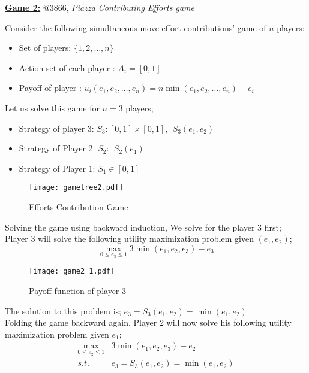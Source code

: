 \documentclass[10pt,leqno]{report}
\begin{document}
\textbf{\underline{Game 2:}} @3866, \textit{Piazza Contributing Efforts game}

\begin{tcolorbox}
    Consider the following simultaneous-move effort-contributions' game of $n$ players: 
    \begin{itemize}
        \item Set of players: $\{1,2,\ldots,n\}$
        \item Action set of each player : $A_i=[0,1]$
        \item Payoff of player : $u_i(e_1,e_2,\ldots, e_n)=n\min(e_1,e_2,\ldots,e_n)-e_i$
    \end{itemize} 
    \vspace{2pt}
    Let us solve this game for $n=3$ players; \\ 
    \begin{itemize}
        \item Strategy of player 3: \(S_{3}: [0,1] \times [0,1] , \ \ S_{3}(e_{1},e_{2})\)
        \item Strategy of Player 2: \(S_{2}: \ \ S_{2}(e_{1})\)
        \item Strategy of Player 1: \(S_{1} \in [0,1]\)
    \end{itemize} 
 \end{tcolorbox}   
 \begin{figure}[H]
    \centering
     \texttt{[image: gametree2.pdf]}
    \caption{Efforts Contribution Game}
\end{figure}  
    Solving the game using backward induction, We solve for the player $3$ first; \\
    Player 3 will solve the following utility maximization problem given $(e_{1},e_{2})$;
    \begin{equation*}
        \max_{0\leq e_{3} \leq 1}  3\min(e_{1},e_{2},e_{3})-e_{3}
    \end{equation*}
    \begin{figure}[H]
        \centering
         \texttt{[image: game2\_1.pdf]}
        \caption{Payoff function of player 3 }
    \end{figure}   
    The solution to this problem is; \(e_{3}=S_{3}(e_{1},e_{2})=\min(e_{1},e_{2})\)\\
    Folding the game backward again, Player 2 will now solve his following utility maximization problem given \(e_{1}\);
    \begin{eqnarray*}
        \max_{0\leq e_{2} \leq 1} & 3\min(e_{1},e_{2},e_{3})-e_{2} \\
        s.t. & e_{3}=S_{3}(e_{1},e_{2})=\min(e_{1},e_{2}) 
    \end{eqnarray*}
\end{document}
